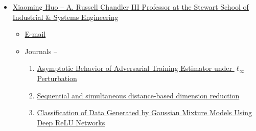 \begin{itemize}
    \item \href{https://sites.gatech.edu/xiaoming-huo/}{Xiaoming Huo -- A. Russell Chandler III Professor at the Stewart School of Industrial \& Systems Engineering}
        \begin{itemize}
            \item \href{mailto:huo@isye.gatech.edu}{E-mail}
            \item Journals --
                \begin{enumerate}
                    \item \href{https://doi.org/10.1080/01621459.2025.2485346}{Asymptotic Behavior of Adversarial Training Estimator under $\ell_\infty$ Perturbation}
                    \item \href{https://doi.org/10.1080/10485252.2025.2451036}{Sequential and simultaneous distance-based dimension reduction}
                    \item \href{https://jmlr.org/papers/v25/23-0957.html}{Classification of Data Generated by Gaussian Mixture Models Using Deep ReLU Networks}
                \end{enumerate}
        \end{itemize}
\end{itemize}


